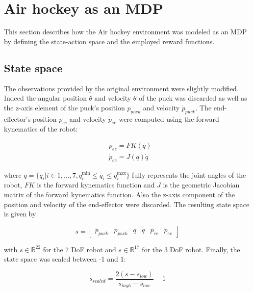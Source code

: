 \section{Air hockey as an MDP}
\label{sec:air_hockey_mdp}

This section describes how the Air hockey environment was modeled as an MDP by defining the state-action space and the employed reward functions.

\subsection{State space}

The observations provided by the original environment were slightly modified. Indeed the angular position $\theta$ and velocity $\dot{\theta}$ of the puck was discarded as well
as the z-axis element of the puck's position ${p}_{puck}$ and velocity ${\dot{p}}_{puck}$. The end-effector's position ${p}_{ee}$ and velocity
${\dot{p}}_{ee}$ were computed using the forward kynematics of the robot:

\begin{equation*}
    \begin{aligned}
        &{p}_{ee} = FK({q}) \\
        &{\dot{p}}_{ee} = {J}({q}){\dot{q}}
    \end{aligned}
\end{equation*}

where $q = \{q_i | i \in 1, \dots, 7, q^{\min}_i \le q_i \le q^{\max}_i \}$ fully represents the joint angles of the robot, $FK$ is the forward kynematics function and ${J}$ is the geometric Jacobian matrix of the forward kynematics function. Also the z-axis component of the position and velocity of the end-effector
were discarded. The resulting state space is given by
        
\begin{equation*}
    {s} = \begin{bmatrix}
            {p}_{puck} & {\dot{p}}_{puck} & {q} & {\dot{q}} & {p}_{ee} & {\dot{p}}_{ee}
        \end{bmatrix}
\end{equation*}


with $s \in \mathbb{R}^{22}$ for the 7 DoF robot and $s \in \mathbb{R}^{17}$ for the 3 DoF robot.
Finally, the state space was scaled between -1 and 1:

\begin{equation*}
    {s}_{scaled} = \frac{2\left(s - s_{low}\right)}{s_{high} - s_{low}} - 1
\end{equation*}

